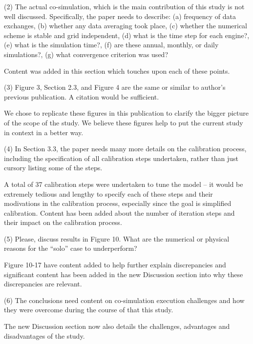 \documentclass[answers,12pt]{exam}
\begin{document}
\begin{questions}
\question 
(2) The actual co-simulation, which is the main contribution of this study is not well discussed. Specifically, the paper needs to describe: (a) frequency of data exchanges, (b) whether any data averaging took place, (c) whether the numerical scheme is stable and grid independent, (d) what is the time step for each engine?, (e) what is the simulation time?, (f) are these annual, monthly, or daily simulations?, (g) what convergence criterion was used? 
\begin{solution}
Content was added in this section which touches upon each of these points.
\end{solution}

\question 
(3) Figure 3, Section 2.3, and Figure 4 are the same or similar to author’s previous publication. A citation would be sufficient. 
\begin{solution}
We chose to replicate these figures in this publication to clarify the bigger picture of the scope of the study. We believe these figures help to put the current study in context in a better way.
\end{solution}

\question 
(4) In Section 3.3, the paper needs many more details on the calibration process, including the specification of all calibration steps undertaken, rather than just cursory listing some of the steps. 
\begin{solution}
A total of 37 calibration steps were undertaken to tune the model -- it would be extremely tedious and lengthy to specify each of these steps and their modivations in the calibration process, especially since the goal is simplified calibration. Content has been added about the number of iteration steps and their impact on the calibration process.
\end{solution}

\question 
(5) Please, discuss results in Figure 10. What are the numerical or physical reasons for the “solo” case to underperform? 
\begin{solution}
Figure 10-17 have content added to help further explain discrepancies and significant content has been added in the new Discussion section into why these discrepancies are relevant.
\end{solution}

\question 
(6) The conclusions need content on co-simulation execution challenges and how they were overcome during the course of that this study.
\begin{solution}
The new Discussion section now also details the challenges, advantages and disadvantages of the study.
\end{solution}
\end{questions}
\end{document}
